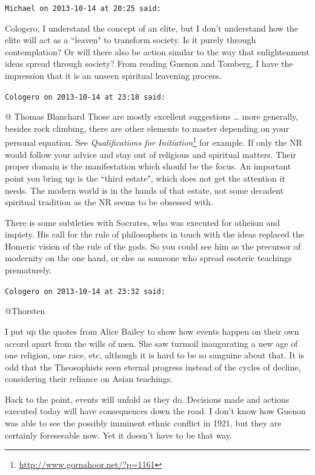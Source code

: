 \begin{footnotesize}
\begin{sffamily}
\hfill

\texttt{Michael on 2013-10-14 at 20:25 said: }

Cologero, I understand the concept of an elite, but I don't understand how the elite will act as a
``leaven" to transform society. Is it purely through contemplation? Or will there also be action similar to the way that
enlightenment ideas spread through society? From reading Guenon and Tomberg, I have the impression that it is an unseen
spiritual leavening process.


\hfill

\texttt{Cologero on 2013-10-14 at 23:18 said: }

@ Thomas Blanchard Those are mostly excellent suggestions … more generally, besides rock climbing, there are other
elements to master depending on your personal equation. See \textit{Qualifications for Initiation}\footnote{\url{http://www.gornahoor.net/?p=1161}} for example. If only the NR
would follow your advice and stay out of religious and spiritual matters. Their proper domain is the manifestation
which should be the focus. An important point you bring up is the ``third estate", which does not get the attention it
needs. The modern world is in the hands of that estate, not some decadent spiritual tradition as the NR seems to be
obsessed with.

There is some subtleties with Socrates, who was executed for atheism and impiety. His call for the rule of philosophers
in touch with the ideas replaced the Homeric vision of the rule of the gods. So you could see him as the precursor of
modernity on the one hand, or else as someone who spread esoteric teachings prematurely.


\hfill

\texttt{Cologero on 2013-10-14 at 23:32 said: }

@Thorsten

I put up the quotes from Alice Bailey to show how events happen on their own accord apart from the wills of men. She saw
turmoil inaugurating a new age of one religion, one race, etc, although it is hard to be so sanguine about that. It is
odd that the Theosophists seen eternal progress instead of the cycles of decline, considering their reliance on Asian
teachings.

Back to the point, events will unfold as they do. Decisions made and actions executed today will have consequences down
the road. I don't know how Guenon was able to see the possibly imminent ethnic conflict in 1921,
but they are certainly foreseeable now. Yet it doesn't have to be that way.


\end{sffamily}
\end{footnotesize}

